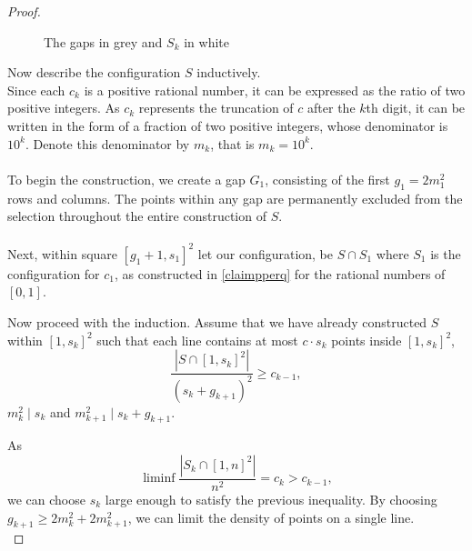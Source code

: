 \documentclass[11pt,a4paper]{article}
\numberwithin{equation}{section}
\begin{document}
\begin{proof}
\begin{figure}[!hbt]
\caption{The gaps in grey and $S_k$ in white}
\label{fig: emptygaps}
\end{figure}


Now describe the configuration $S$ inductively.\\
Since each $c_k$ is a positive rational number, it can be expressed as the ratio of two positive integers. As $c_k$ represents the truncation of $c$ after the $k$th digit, it can be written in the form of a fraction of two positive integers, whose denominator is $10^k$. Denote this denominator by $m_k$, that is $m_k=10^k$.~\\\\
To begin the construction, we create a gap $G_1$, consisting of the first $g_1=2m_1^2$ rows and columns. The points within any gap are permanently excluded from the selection throughout the entire construction of $S$.~\\\\
Next, within square $[g_1+1,s_1]^2$ let our configuration, be $S\cap S_1$ where $S_1$ is the configuration  for $c_1$,
as constructed in \cref{claimpperq} for the rational numbers of $[0,1]$. 


Now proceed with the induction. 
Assume that we have already constructed $S$ within $[1,s_k]^2$ such that each line contains at most $c\cdot s_k$ points inside $[1,s_k]^2$,  $$\frac{|S\cap [1,s_k]^2|}{(s_k+g_{k+1})^2}\ge c_{k-1},$$ $m_{k}^2\mid s_k$ and $m_{k+1}^2\mid s_k +g_{k+1}$.

As $$\liminf \frac{|S_k\cap [1,n]^2|}{n^2}=c_k>c_{k-1}, $$ we can choose $s_k$ large enough to satisfy the previous inequality. By choosing $g_{k+1}\ge 2m_k^2+2m_{k+1}^2$, we can limit the density of points on a single line. \\


\end{proof}
\end{document}
